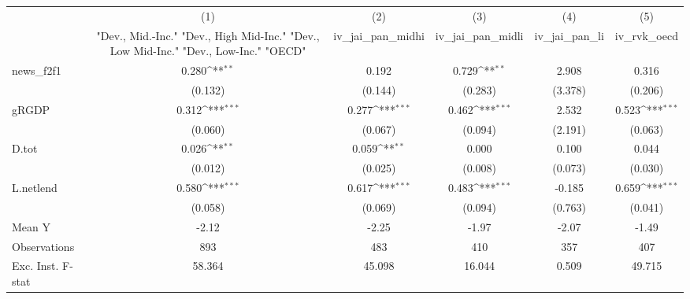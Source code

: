 {
\def\sym#1{\ifmmode^{#1}\else\(^{#1}\)\fi}
\begin{tabular}{l*{5}{c}}
\toprule
            &\multicolumn{1}{c}{(1)}&\multicolumn{1}{c}{(2)}&\multicolumn{1}{c}{(3)}&\multicolumn{1}{c}{(4)}&\multicolumn{1}{c}{(5)}\\
            &\multicolumn{1}{c}{ "Dev., Mid.-Inc." "Dev., High Mid-Inc." "Dev., Low Mid-Inc." "Dev., Low-Inc." "OECD" }&\multicolumn{1}{c}{iv\_jai\_pan\_midhi}&\multicolumn{1}{c}{iv\_jai\_pan\_midli}&\multicolumn{1}{c}{iv\_jai\_pan\_li}&\multicolumn{1}{c}{iv\_rvk\_oecd}\\
\midrule
news\_f2f1   &       0.280\sym{**} &       0.192         &       0.729\sym{**} &       2.908         &       0.316         \\
            &     (0.132)         &     (0.144)         &     (0.283)         &     (3.378)         &     (0.206)         \\
\addlinespace
gRGDP       &       0.312\sym{***}&       0.277\sym{***}&       0.462\sym{***}&       2.532         &       0.523\sym{***}\\
            &     (0.060)         &     (0.067)         &     (0.094)         &     (2.191)         &     (0.063)         \\
\addlinespace
D.tot       &       0.026\sym{**} &       0.059\sym{**} &       0.000         &       0.100         &       0.044         \\
            &     (0.012)         &     (0.025)         &     (0.008)         &     (0.073)         &     (0.030)         \\
\addlinespace
L.netlend   &       0.580\sym{***}&       0.617\sym{***}&       0.483\sym{***}&      -0.185         &       0.659\sym{***}\\
            &     (0.058)         &     (0.069)         &     (0.094)         &     (0.763)         &     (0.041)         \\
\midrule
Mean Y      &       -2.12         &       -2.25         &       -1.97         &       -2.07         &       -1.49         \\
Observations&         893         &         483         &         410         &         357         &         407         \\
Exc. Inst. F-stat&      58.364         &      45.098         &      16.044         &       0.509         &      49.715         \\
\bottomrule
\end{tabular}
}

